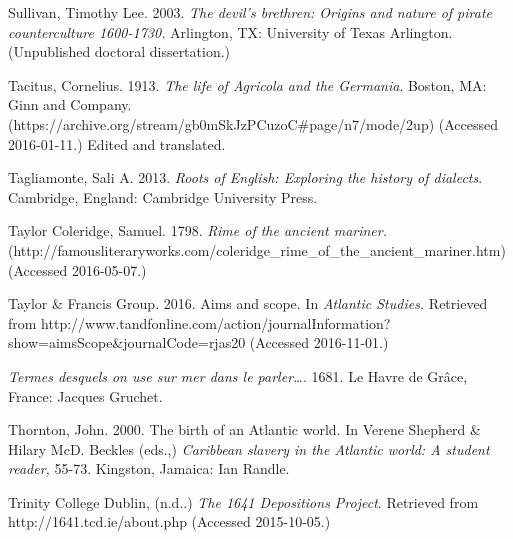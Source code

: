 \begin{styleStandard}
Sullivan, Timothy Lee. 2003. \textit{The devil’s brethren: Origins and nature of pirate counterculture 1600-1730. }Arlington, TX: University of Texas Arlington. (Unpublished doctoral dissertation.)
\end{styleStandard}


\begin{styleStandard}
Tacitus, Cornelius. 1913. \textit{The life of Agricola and the Germania}. Boston, MA: Ginn and Company. (https://archive.org/stream/gb0mSkJzPCuzoC\#page/n7/mode/2up) (Accessed 2016-01-11.) Edited and translated. 
\end{styleStandard}


\begin{styleStandard}
Tagliamonte, Sali A. 2013. \textit{Roots of English: Exploring the history of dialects}. Cambridge, England: Cambridge University Press.
\end{styleStandard}


\begin{styleStandard}
Taylor Coleridge, Samuel. 1798. \textit{Rime of the ancient mariner. }(http://famousliteraryworks.com/coleridge\_rime\_of\_the\_ancient\_mariner.htm) (Accessed 2016-05-07.)
\end{styleStandard}


\begin{styleStandard}
Taylor \& Francis Group. 2016. Aims and scope. In \textit{Atlantic Studies.} Retrieved from http://www.tandfonline.com/action/journalInformation?show=aimsScope\&journalCode=rjas20 (Accessed 2016-11-01.)
\end{styleStandard}


\begin{styleStandard}
\textit{Termes desquels on use sur mer dans le parler…. }1681. Le Havre de Grâce, France: Jacques Gruchet. 
\end{styleStandard}


\begin{styleStandard}
Thornton, John. 2000. The birth of an Atlantic world. In Verene Shepherd \& Hilary McD. Beckles (eds.,) \textit{Caribbean slavery in the Atlantic world: A student reader, }55-73. Kingston, Jamaica: Ian Randle.
\end{styleStandard}


\begin{styleStandard}
Trinity College Dublin, (n.d..) \textit{The 1641 Depositions Project}. Retrieved from http://1641.tcd.ie/about.php (Accessed 2015-10-05.)
\end{styleStandard}


